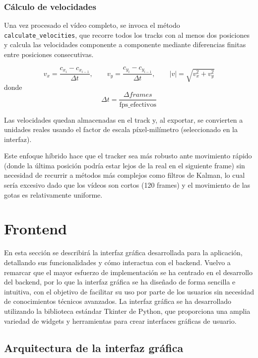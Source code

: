 \subsubsection{Cálculo de velocidades}

Una vez procesado el vídeo completo, se invoca el método \texttt{calculate\_velocities}, que recorre todos los tracks con al menos dos posiciones y calcula las velocidades componente a componente mediante diferencias finitas entre posiciones consecutivas.

\begin{equation}
    v_x = \frac{c_{x_{i}} - c_{x_{i-1}}}{\Delta t}, \qquad v_y = \frac{c_{y_{i}} - c_{y_{i-1}}}{\Delta t}, \qquad
    |v| = \sqrt{v_x^2 + v_y^2}
\end{equation}
donde 
\begin{equation}
    \Delta t = \frac{\Delta {frames}}{\text{fps\_efectivos}}
\end{equation}

Las velocidades quedan almacenadas en el track y, al exportar, se convierten a unidades reales usando el factor de escala píxel-milímetro (seleccionado en la interfaz).

Este enfoque híbrido hace que el tracker sea más robusto ante movimiento rápido (donde la última posición podría estar lejos de la real en el siguiente frame) sin necesidad de recurrir a métodos más complejos como filtros de Kalman, lo cual sería excesivo dado que los vídeos son cortos (120 frames) y el movimiento de las gotas es relativamente uniforme.


\section{Frontend}

En esta sección se describirá la interfaz gráfica desarrollada para la aplicación, detallando sus funcionalidades y cómo interactua con el backend. Vuelvo a remarcar que el mayor esfuerzo de implementación se ha centrado en el desarrollo del backend, por lo que la interfaz gráfica se ha diseñado de forma sencilla e intuitiva, con el objetivo de facilitar su uso por parte de los usuarios sin necesidad de conocimientos técnicos avanzados. La interfaz gráfica se ha desarrollado utilizando la biblioteca estándar Tkinter \cite{tkinter_library} de Python, que proporciona una amplia variedad de widgets y herramientas para crear interfaces gráficas de usuario.

\subsection{Arquitectura de la interfaz gráfica}

